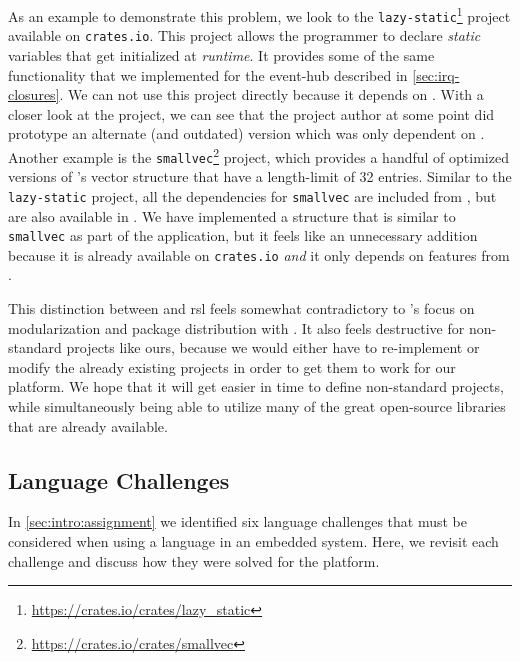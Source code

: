 As an example to demonstrate this problem, we look to the \texttt{lazy-static}\footnote{\url{https://crates.io/crates/lazy_static}} project available on \texttt{crates.io}.
This project allows the programmer to declare \emph{static} variables that get initialized at \emph{runtime}.
It provides some of the same functionality that we implemented for the event-hub described in \autoref{sec:irq-closures}.
We can not use this project directly because it depends on {\std}.
With a closer look at the project, we can see that the project author at some point did prototype an alternate (and outdated) version which was only dependent on {\core}.
Another example is the \texttt{smallvec}\footnote{\url{https://crates.io/crates/smallvec}} project, which provides a handful of optimized versions of {\rust}'s vector structure that have a length-limit of 32 entries.
Similar to the \texttt{lazy-static} project, all the dependencies for \texttt{smallvec} are included from {\std}, but are also available in {\core}.
We have implemented a structure that is similar to \texttt{smallvec} as part of the {\tracker} application, but it feels like an unnecessary addition because it is already available on \texttt{crates.io} \emph{and} it only depends on features from {\core}.

This distinction between {\std} and \gls{rsl} feels somewhat contradictory to {\rust}'s focus on modularization and package distribution with {\cargo}.
It also feels destructive for non-standard projects like ours, because we would either have to re-implement or modify the already existing projects in order to get them to work for our platform.
We hope that it will get easier in time to define non-standard projects, while simultaneously being able to utilize many of the great open-source libraries that are already available.

\subsection{Language Challenges}
\label{sec:disc:lang-challenges}

In \autoref{sec:intro:assignment} we identified six language challenges that must be considered when using a language in an embedded system.
Here, we revisit each challenge and discuss how they were solved for the {\rg} platform.

